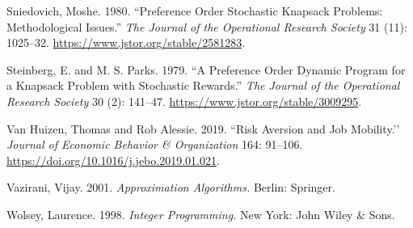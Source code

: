 \documentclass[11pt]{article} %
\theoremstyle{definition}
\theoremstyle{definition}
\begin{document}
Sniedovich, Moshe. 1980. ``Preference Order Stochastic Knapsack Problems: Methodological Issues.'' \emph{The Journal of the Operational Research Society} 31 (11): 1025--32. \url{https://www.jstor.org/stable/2581283}. 

Steinberg, E. and M. S. Parks. 1979. ``A Preference Order Dynamic Program for a Knapsack Problem with Stochastic Rewards.'' \emph{The Journal of the Operational Research Society} 30 (2): 141--47. \url{https://www.jstor.org/stable/3009295}. 


Van Huizen, Thomas and Rob Alessie. 2019. ``Risk Aversion and Job Mobility.’’ \emph{Journal of Economic Behavior \& Organization} 164: 91--106. \url{https://doi.org/10.1016/j.jebo.2019.01.021}.

Vazirani, Vijay. 2001. \emph{Approximation Algorithms.} Berlin: Springer. 

Wolsey, Laurence. 1998. \emph{Integer Programming.} New York: John Wiley \& Sons. 
\end{document}
